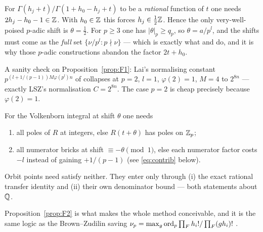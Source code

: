 \begin{proposition}[(F1) very-well-poisedness forces $\theta=\tfrac12$, i.e.\ $p=2$]\label{prop:F1}
\PROVED{} For $\Gamma(h_j+t)/\Gamma(1+h_0-h_j+t)$ to be a \emph{rational} function of $t$
one needs $2h_j-h_0-1\in\mathbb{Z}$. With $h_0\in\mathbb{Z}$ this forces $h_j\in\tfrac12\mathbb{Z}$. Hence the
only very-well-poised $p$-adic shift is $\theta=\tfrac12$. For $p\ge3$ one has
$|\theta|_p\ge q_p$, so $\theta=a/p^l$, and the shifts must come as the \emph{full} set
$\{\nu/p^l:p\nmid\nu\}$ --- which is exactly what \cite[Def.~16]{LaiSprang2023} and
\cite[\S7]{Lai2024} do, and it is why those $p$-adic constructions abandon the factor
$2t+h_0$.
\end{proposition}

A sanity check on Proposition~\ref{prop:F1}: Lai's normalising constant
$p^{(l+1/(p-1))M\varphi(p^l)n}$ of \cite[\S7]{Lai2024} collapses at $p=2$, $l=1$,
$\varphi(2)=1$, $M=4$ to $2^{8n}$ --- exactly LSZ's normalisation $C=2^{8n}$. The case
$p=2$ is cheap precisely because $\varphi(2)=1$.

\begin{proposition}\label{prop:F2}
\PROVED{} For the Volkenborn integral at shift $\theta$ one needs
\begin{enumerate}[label=\textup{(R\arabic*)},leftmargin=2.8em]
\item all poles of $R$ at integers, else $R(t+\theta)$ has poles on $\mathbb{Z}_p$;
\item all numerator bricks at shift $\equiv-\theta\pmod1$, else each numerator factor costs
      $-l$ instead of gaining $+1/(p-1)$ (see \eqref{eq:contrib} below).
\end{enumerate}
Orbit points need satisfy neither. They enter only through (i) the exact rational transfer
identity and (ii) their own denominator bound --- both statements about $\mathbb{Q}$.
\end{proposition}

Proposition~\ref{prop:F2} is what makes the whole method conceivable, and it is the same
logic as the Brown--Zudilin saving
$\nu_p=\max_{g}\operatorname{ord}_p\prod_Fh_i!/\prod_F(gh_i)!$ \cite{BrownZudilin2022}.

